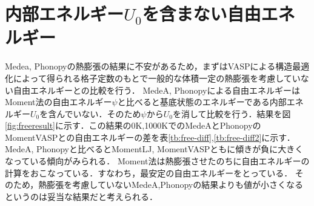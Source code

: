 \section{内部エネルギー$U_0$を含まない自由エネルギー}
Medea, Phonopyの熱膨張の結果に不安があるため，まずはVASPによる構造最適化によって得られる格子定数のもとで一般的な体積一定の熱膨張を考慮していない自由エネルギーとの比較を行う．
MedeA, Phonopyによる自由エネルギーはMoment法の自由エネルギー$\psi$と比べると基底状態のエネルギーである内部エネルギー$U_0$を含んでいない．そのため$\psi$から$U_0$を消して比較を行う．結果を図\ref{fig:freeresult}に示す．この結果の0K,1000KでのMedeAとPhonopyのMomentVASPとの自由エネルギーの差を表\ref{tb:free-diff},\ref{tb:free-diff2}に示す．
MedeA, Phonopyと比べるとMomentLJ, MomentVASPともに傾きが負に大きくなっている傾向がみられる．
Moment法は熱膨張させたのちに自由エネルギーの計算をおこなっている．すなわち，最安定の自由エネルギーをとっている．
そのため，熱膨張を考慮していないMedeA,Phonopyの結果よりも値が小さくなるというのは妥当な結果だと考えられる．

